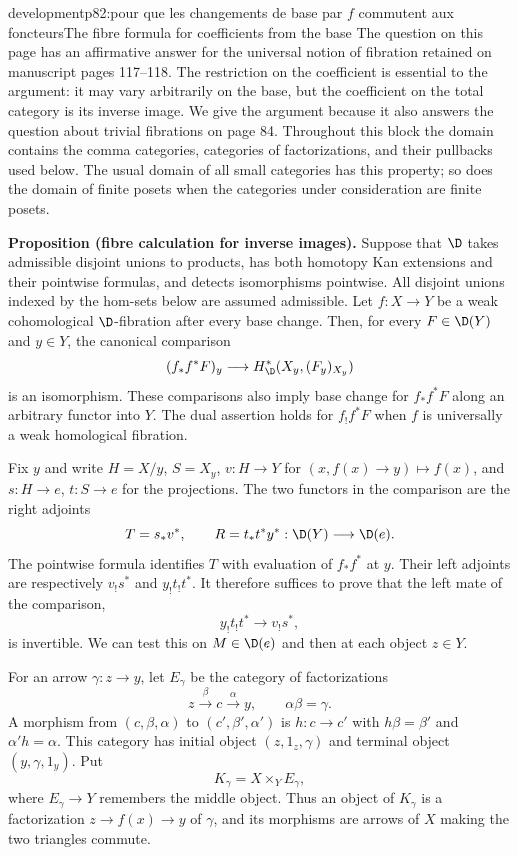 \begin{dcomment}{development}{p82:pour que les changements de base par $f$ commutent aux foncteurs}{The fibre formula for coefficients from the base}
The question on this page has an affirmative answer for the universal notion of fibration retained on manuscript pages 117--118. The restriction on the coefficient is essential to the argument: it may vary arbitrarily on the base, but the coefficient on the total category is its inverse image. We give the argument because it also answers the question about trivial fibrations on page 84. Throughout this block the domain contains the comma categories, categories of factorizations, and their pullbacks used below. The usual domain of all small categories has this property; so does the domain of finite posets when the categories under consideration are finite posets.

\textbf{Proposition (fibre calculation for inverse images).}\ours
Suppose that $\D$ takes admissible disjoint unions to products, has both homotopy Kan extensions and their pointwise formulas, and detects isomorphisms pointwise. All disjoint unions indexed by the hom-sets below are assumed admissible. Let $f:X\to Y$ be a weak cohomological $\D$-fibration after every base change. Then, for every $F\in\D(Y)$ and $y\in Y$, the canonical comparison
\[
 (f_*f^*F)_y\longrightarrow
 H^*_{\D}(X_y,(F_y)_{X_y})
\]
is an isomorphism. These comparisons also imply base change for $f_*f^*F$ along an arbitrary functor into $Y$. The dual assertion holds for $f_!f^*F$ when $f$ is universally a weak homological fibration.

Fix $y$ and write $H=X/y$, $S=X_y$, $v:H\to Y$ for $(x,f(x)\to y)\mapsto f(x)$, and $s:H\to e$, $t:S\to e$ for the projections. The two functors in the comparison are the right adjoints
\[
 T=s_*v^*,\qquad R=t_*t^*y^* :\D(Y)\longrightarrow\D(e).
\]
The pointwise formula identifies $T$ with evaluation of $f_*f^*$ at $y$. Their left adjoints are respectively $v_!s^*$ and $y_!t_!t^*$. It therefore suffices to prove that the left mate of the comparison,
\[
 y_!t_!t^*\longrightarrow v_!s^*,
\]
is invertible. We can test this on $M\in\D(e)$ and then at each object $z\in Y$.

For an arrow $\gamma:z\to y$, let $E_\gamma$ be the category of factorizations
\[
 z\xrightarrow{\beta}c\xrightarrow{\alpha}y,
 \qquad \alpha\beta=\gamma.
\]
A morphism from $(c,\beta,\alpha)$ to $(c',\beta',\alpha')$ is $h:c\to c'$ with $h\beta=\beta'$ and $\alpha'h=\alpha$. This category has initial object $(z,1_z,\gamma)$ and terminal object $(y,\gamma,1_y)$. Put
\[
 K_\gamma=X\times_Y E_\gamma,
\]
where $E_\gamma\to Y$ remembers the middle object. Thus an object of $K_\gamma$ is a factorization $z\to f(x)\to y$ of $\gamma$, and its morphisms are arrows of $X$ making the two triangles commute.


\end{dcomment}
